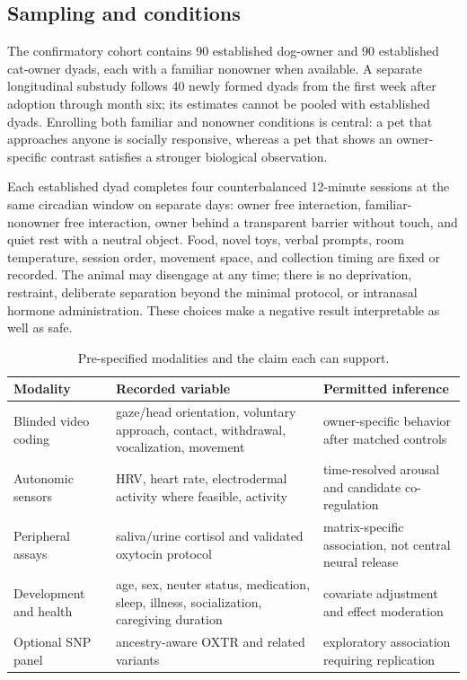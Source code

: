 \documentclass[conference]{IEEEtran}
\begin{document}
\subsection{Sampling and conditions}

The confirmatory cohort contains 90 established dog-owner and 90 established cat-owner dyads, each with a familiar nonowner when available. A separate longitudinal substudy follows 40 newly formed dyads from the first week after adoption through month six; its estimates cannot be pooled with established dyads. Enrolling both familiar and nonowner conditions is central: a pet that approaches anyone is socially responsive, whereas a pet that shows an owner-specific contrast satisfies a stronger biological observation.

Each established dyad completes four counterbalanced 12-minute sessions at the same circadian window on separate days: owner free interaction, familiar-nonowner free interaction, owner behind a transparent barrier without touch, and quiet rest with a neutral object. Food, novel toys, verbal prompts, room temperature, session order, movement space, and collection timing are fixed or recorded. The animal may disengage at any time; there is no deprivation, restraint, deliberate separation beyond the minimal protocol, or intranasal hormone administration. These choices make a negative result interpretable as well as safe.

\begin{table}[t]
\caption{Pre-specified modalities and the claim each can support.}
\label{tab:modalities}
\centering
\footnotesize
\begin{tabular}{p{}p{}p{}}
\toprule
\textbf{Modality} & \textbf{Recorded variable} & \textbf{Permitted inference} \\
\midrule
Blinded video coding & gaze/head orientation, voluntary approach, contact, withdrawal, vocalization, movement & owner-specific behavior after matched controls \\
Autonomic sensors & HRV, heart rate, electrodermal activity where feasible, activity & time-resolved arousal and candidate co-regulation \\
Peripheral assays & saliva/urine cortisol and validated oxytocin protocol & matrix-specific association, not central neural release \\
Development and health & age, sex, neuter status, medication, sleep, illness, socialization, caregiving duration & covariate adjustment and effect moderation \\
Optional SNP panel & ancestry-aware OXTR and related variants & exploratory association requiring replication \\
\bottomrule
\end{tabular}
\end{table}
\end{document}
